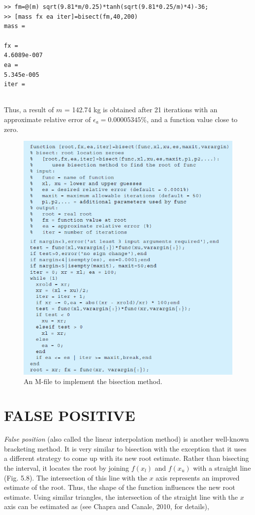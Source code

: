 \documentclass[../main.tex]{subfiles}
\begin{document}
\texttt{>> fm=@(m) sqrt(9.81*m/0.25)*tanh(sqrt(9.81*0.25/m)*4)-36;\\
\indent >> [mass fx ea iter]=bisect(fm,40,200)\\
\indent mass =\\
\indent{}\\
\indent fx =\\
\indent\indent 4.6089e-007\\
\indent ea =\\
\indent\indent 5.345e-005\\
\indent iter =\\
\indent{}\\}

\noindent Thus, a result of $m$ = 142.74 kg is obtained after 21 iterations with an approximate relative
error of $\epsilon_a = 0.00005345\%$, and a function value close to zero.

\begin{figure}[h]
    \includegraphics[width=0.8\linewidth]{./images/fig_5_7}
    \caption{An M-file to implement the bisection method.}
\end{figure}
\vspace{1.5 cm}

\newpage
\section[FALSE POSITIVE]{FALSE POSITIVE}
\noindent \emph{False position} (also called the linear interpolation method) is another well-known bracketing
method. It is very similar to bisection with the exception that it uses a different strategy
to come up with its new root estimate. Rather than bisecting the interval, it locates the root
by joining $f (x_l )$ and $f (x_u)$ with a straight line (Fig. 5.8). The intersection of this line with
the $x$ axis represents an improved estimate of the root. Thus, the shape of the function influences
the new root estimate. Using similar triangles, the intersection of the straight line
with the $x$ axis can be estimated as (see Chapra and Canale, 2010, for details),
\end{document}
